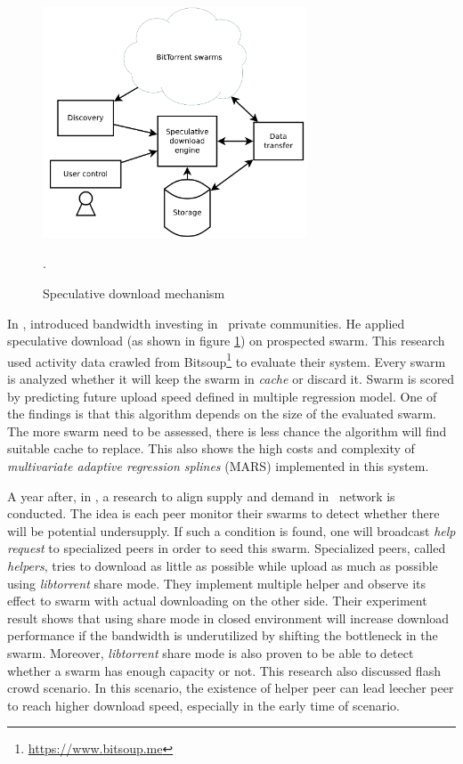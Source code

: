 \begin{figure}[h]
	\centering
	\includegraphics[width=0.7\textwidth]{pics/SDE2013.png}
	\caption{Speculative download mechanism \cite{2013:investmentcm:capota}}.
	\label{fig:sde13}
\end{figure}

In \citeyear{2013:investmentcm:capota}, \citeauthor{2013:investmentcm:capota} introduced bandwidth investing in \bt~private communities. He applied speculative download (as shown in figure \ref{fig:sde13}) on prospected swarm. This research used activity data crawled from Bitsoup\footnote{\url{https://www.bitsoup.me}} to evaluate their system. Every swarm is analyzed whether it will keep the swarm in \textit{cache} or discard it. Swarm is scored by predicting future upload speed defined in multiple regression model\cite{2013:investmentcm:capota}. One of the findings is that this algorithm depends on the size of the evaluated swarm. The more swarm need to be assessed, there is less chance the algorithm will find suitable cache to replace. This also shows the high costs and complexity of \textit{multivariate adaptive regression splines} (MARS) implemented in this system.

A year after, in \citeyear{2014:bwmarket:capota}, a research to align supply and demand in \bt~network is conducted. The idea is each peer monitor their swarms to detect whether there will be potential undersupply. If such a condition is found, one will broadcast \textit{help request} to specialized peers in order to seed this swarm. Specialized peers, called \textit{helpers}, tries to download as little as possible while upload as much as possible using \textit{libtorrent} share mode. They implement multiple helper and observe its effect to swarm with actual downloading on the other side. Their experiment result shows that using share mode in closed environment will increase download performance if the bandwidth is underutilized \cite{2014:bwmarket:capota} by shifting the bottleneck in the swarm. Moreover, \textit{libtorrent} share mode is also proven to be able to detect whether a swarm has enough capacity or not. This research also discussed flash crowd scenario. In this scenario, the existence of helper peer can lead leecher peer to reach higher download speed, especially in the early time of scenario. 

